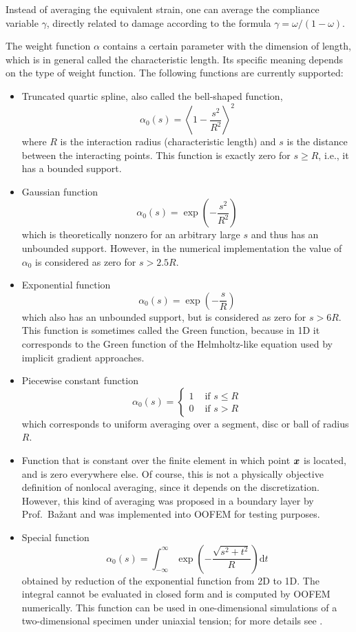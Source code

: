 \documentclass[a4paper]{article}
\newcommand{\mbf}[1]{\mbox{\boldmath$#1$}}
\begin{document}
Instead
of averaging the equivalent strain, one can average the compliance variable
$\gamma$, directly related to damage according to the formula 
$\gamma=\omega/(1-\omega)$.

The weight function $\alpha$ contains a certain parameter with the dimension
of length, which is in general called the characteristic length. Its specific
meaning depends on the type of weight function. The following functions are
currently supported:
\begin{itemize}
\item
Truncated quartic spline, also called the bell-shaped function,
$$
\alpha_0(s) = \left\langle 1-\frac{s^2}{R^2}\right\rangle^2
$$
where $R$ is the interaction radius (characteristic length) and 
$s$ is the distance between the interacting points. This function 
is exactly zero for $s\ge R$, i.e., it has a bounded support.
\item
Gaussian function
$$
\alpha_0(s) = \exp\left(-\frac{s^2}{R^2}\right)
$$
which is theoretically nonzero for an arbitrary large $s$ and thus
has an unbounded support. However, in the numerical implementation
the value of $\alpha_0$ is considered as zero for $s>2.5R$.
\item
Exponential function
$$
\alpha_0(s) = \exp\left(-\frac{s}{R}\right)
$$
which also has an unbounded support, but is considered as zero for $s>6R$.
This function is sometimes called the Green function, because in 1D it
corresponds to the Green function of the Helmholtz-like equation used
by implicit gradient approaches.
\item
Piecewise constant function
$$
\alpha_0(s) =\left\{\begin{array}{cc} 1 & \mbox{ if } s\le R \\ 0 & \mbox{ if } s> R \end{array}\right.
$$
which corresponds to uniform averaging over a segment, disc or ball
of radius $R$. 
\item
Function that is constant over the finite element in which point $\mbf{x}$
is located, and is zero everywhere else. Of course, this is not a physically
objective definition of nonlocal averaging, since it depends on the
discretization. However, this kind of averaging was proposed in a boundary
layer by Prof.\ Ba\v{z}ant and was implemented into OOFEM for testing purposes.
\item
Special function 
$$
\alpha_0(s) =\int_{-\infty}^\infty \exp\left(-\frac{\sqrt{s^2+t^2}}{R}\right)\mbox{d}t
$$
obtained by reduction of the exponential function from 2D to 1D.
The integral cannot be evaluated in closed form and is computed by OOFEM numerically.
This function can be used in one-dimensional simulations of a two-dimensional specimen 
under uniaxial tension; for more details see \cite{Gra14}.
\end{itemize}  
 
\end{document}
